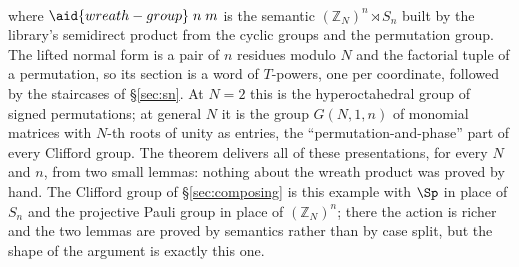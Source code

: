 \begingroup\renewcommand{\AgdaCodeStyle}{\footnotesize}
\begin{code}%
\>[0]\AgdaSpace{}%
\AgdaSymbol{:}\AgdaSpace{}%
\AgdaSpace{}%
\AgdaSpace{}%
\AgdaSpace{}%
%
\>[412I]\AgdaSymbol{(((}\AgdaSpace{}%
\AgdaSpace{}%
\AgdaSymbol{)}\AgdaSpace{}%
\AgdaSpace{}%
\AgdaSymbol{)}\AgdaSpace{}%
\AgdaSpace{}%
\AgdaSymbol{(}\AgdaSpace{}%
\AgdaSymbol{)}\AgdaSpace{}%
\AgdaSpace{}%
\AgdaSpace{}%
\AgdaSymbol{)}\<%
\\
\>[412I][@{}l@{\AgdaIndent{0}}]%
\>[32]\AgdaSpace{}%
\AgdaSymbol{(}\AgdaSpace{}%
\AgdaSpace{}%
\AgdaSymbol{)}\<%
\end{code}
\endgroup
\begin{code}[hide]%
\>[0]\AgdaSpace{}%
\AgdaSymbol{=}\AgdaSpace{}%
\<%
\end{code}

\noindent where $\aid{wreath-group}\;n\;m$ is the semantic
$(\mathbb{Z}_N)^n \rtimes S_n$ built by the library's semidirect
product from the cyclic groups and the permutation group.  The lifted
normal form is a pair of $n$ residues modulo $N$ and the factorial tuple
of a permutation, so its section is a word of $T$-powers, one per
coordinate, followed by the staircases of \S\ref{sec:sn}.  At $N = 2$
this is the hyperoctahedral group of signed permutations; at general
$N$ it is the group $G(N,1,n)$ of monomial matrices with $N$-th roots of
unity as entries, the ``permutation-and-phase'' part of every Clifford
group.  The theorem delivers all of these presentations, for every $N$
and $n$, from two small lemmas: nothing about the wreath product was
proved by hand.  The Clifford group of \S\ref{sec:composing} is this
example with $\Sp$ in place of $S_n$ and the projective Pauli group in
place of $(\mathbb{Z}_N)^n$; there the action is richer and the two
lemmas are proved by semantics rather than by case split, but the shape
of the argument is exactly this one.
